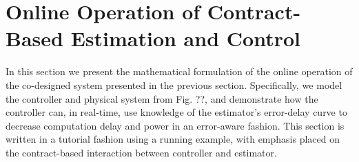 \section{Online Operation of Contract-Based Estimation and Control}
\label{controlProblem}
In this section we present the mathematical formulation of the online operation of the co-designed system presented in the previous section.
Specifically, we model the controller and physical system from Fig. ??, and demonstrate how the controller can, in real-time, use knowledge of the estimator's error-delay curve to decrease computation delay and power in an error-aware fashion.
This section is written in a tutorial fashion using a running example, with emphasis placed on the contract-based interaction between controller and estimator.


